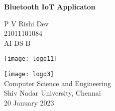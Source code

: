 \begin{titlepage}
    \centering
        \vspace*{2cm}
        \Huge
        \textbf{Bluetooth IoT Applicaton}
        
        \vspace*{0.6cm}
        \Large
        \textit{}
        
        \normalsize
        \vspace*{1.5cm}
        P V Rishi Dev\\
        \vspace{0.2cm}
        21011101084\\
        \vspace{0.2cm}
        AI-DS B\\
        
        \vfill      
        
        
        \texttt{[image: logo11]}\\
        
        \vfill
        
        
        \texttt{[image: logo3]}\\
        Computer Science and Engineering\\
        Shiv Nadar University, Chennai\\
        20 January 2023
        \vspace*{1cm}
    
\end{titlepage}
